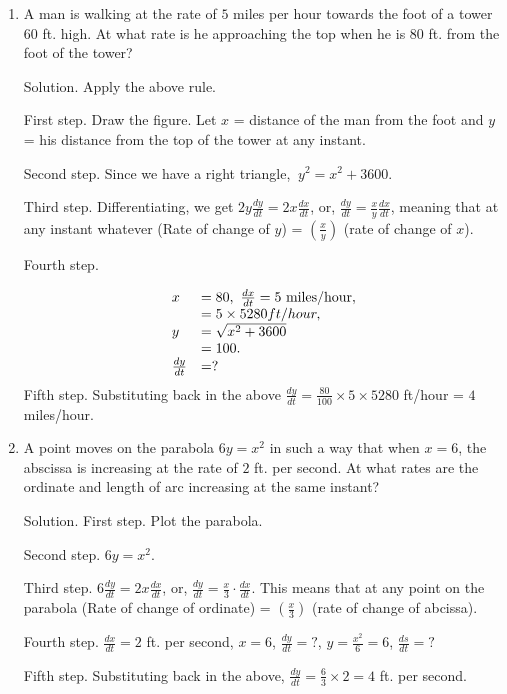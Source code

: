 \begin{enumerate}

\item
A man is walking at the rate of $5$ miles per hour towards the foot 
of a tower $60$ ft. high. At what rate is he approaching the 
top when he is $80$ ft. from the foot of the tower?

Solution. Apply the above rule.

First step. Draw the figure. Let $x$ = distance of the man from 
the foot and $y$ = his distance from the top of the tower at any instant.

Second step. Since we have a right triangle,
$\ y^2 	= x^2 + 3600$.

Third step. Differentiating, we get
$2 y \frac{dy}{dt} 	= 2 x \frac{dx}{dt}$, or,
$\frac{dy}{dt} 	= \frac{x}{y} \frac{dx}{dt}$, 
meaning that at any instant whatever
(Rate of change of $y$) = $\left ( \frac{x}{y} \right )$ 
(rate of change of $x$).

Fourth step. 

\[
\begin{array}{ll}
 x &	= 80,\ 	\frac{dx}{dt} 	= 5\ {\rm miles/hour},\\
  &= 5 \times 5280 ft/hour,\\
y &	= \sqrt{x^2 + 3600}\\
  &	= 100.\\
 \frac{dy}{dt}& 	= ?
\end{array}
\]
Fifth step. 	Substituting back in the above %
$\frac{dy}{dt} 	= \frac{80}{100} \times 5 \times 5280$
ft/hour = $4$ miles/hour. 

\item
A point moves on the parabola $6y = x^2$ in such a way that when 
$x = 6$, the abscissa is increasing at the rate of $2$ ft. per second. 
At what rates are the ordinate and length of arc increasing at the 
same instant?

Solution. First step. Plot the parabola.

Second step. $6 y 	= x^2$.

Third step. $6 \frac{dy}{dt} 	= 2 x\frac{dx}{dt}$, or,
$\frac{dy}{dt} 	= \frac{x}{3} \cdot \frac{dx}{dt}$.
This means that at any point on the parabola
(Rate of change of ordinate) 	
= $\left( \frac{x}{3} \right)$ (rate of change of abcissa).

Fourth step. $\frac{dx}{dt} 	= 2$ ft. per second,
$x = 6$, $\frac{dy}{dt} = ?$, 
$y = \frac{x^2}{6} = 6$, $\frac{ds}{dt} = ?$

Fifth step. Substituting back in the above, %
$\frac{dy}{dt} = \frac{6}{3} \times 2 = 4$ ft. per second. 


\end{enumerate}
